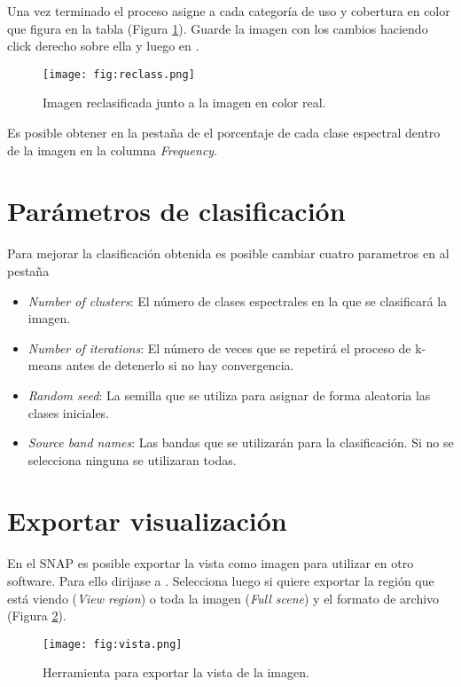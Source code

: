 Una vez terminado el proceso asigne a cada categoría de uso y cobertura en color que figura en la tabla (Figura \ref{fig:resclass}). Guarde la imagen con los cambios haciendo click derecho sobre ella y luego en .

\begin{figure}[h!]
    \centering
    \texttt{[image: fig:reclass.png]}
    \caption{Imagen reclasificada junto a la imagen en color real.}
    \label{fig:resclass}
\end{figure}

Es posible obtener en la pestaña de  el porcentaje de cada clase espectral dentro de la imagen en la columna \emph{Frequency}.

\section{Parámetros de clasificación}

Para mejorar la clasificación obtenida es posible cambiar cuatro parametros en al pestaña 

\begin{itemize}
  \item \emph{Number of clusters}: El número de clases espectrales en la que se clasificará la imagen.
  \item \emph{Number of iterations}: El número de veces que se repetirá el proceso de k-means antes de detenerlo si no hay convergencia.
  \item \emph{Random seed}: La semilla que se utiliza para asignar de forma aleatoria las clases iniciales.
  \item \emph{Source band names}: Las bandas que se utilizarán para la clasificación. Si no se selecciona ninguna se utilizaran todas.
\end{itemize}

\section{Exportar visualización}

En el SNAP es posible exportar la vista como imagen para utilizar en otro software. Para ello dirijase a . Selecciona luego si quiere exportar la región que está viendo (\emph{View region}) o toda la imagen (\emph{Full scene}) y el formato de archivo (Figura \ref{fig:vista}).

\begin{figure}[h!]
    \centering
    \texttt{[image: fig:vista.png]}
    \caption{Herramienta para exportar la vista de la imagen.}
    \label{fig:vista}
\end{figure}

